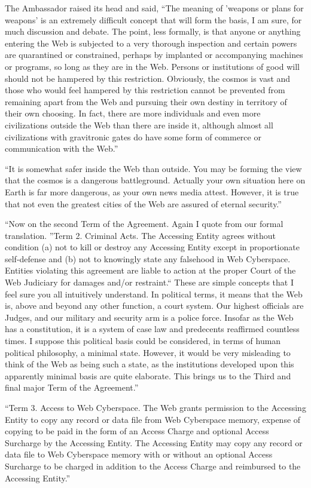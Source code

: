 \documentclass[english,11pt,letterpaper,onecolumn]{scrbook}
\begin{document}
	The Ambassador raised its head and said, ``The meaning of 'weapons or plans for weapons' is an extremely difficult concept that will form the basis, I am sure, for much discussion and debate.  The point, less formally, is that anyone or anything entering the Web is subjected to a very thorough inspection and certain powers are quarantined or constrained, perhaps by implanted or accompanying machines or programs, so long as they are in the Web.  Persons or institutions of good will should not be hampered by this restriction.  Obviously, the cosmos is vast and those who would feel hampered by this restriction cannot be prevented from remaining apart from the Web and pursuing their own destiny in territory of their own choosing.  In fact, there are more individuals and even more civilizations outside the Web than there are inside it, although almost all civilizations with gravitronic gates do have some form of commerce or communication with the Web.''
	
	``It is somewhat safer inside the Web than outside.  You may be forming the view that the cosmos is a dangerous battleground.  Actually your own situation here on Earth is far more dangerous, as your own news media attest.  However, it is true that not even the greatest cities of the Web are assured of eternal security.''
	
	``Now on the second Term of the Agreement.  Again I quote from our formal translation.  ''Term 2.  Criminal Acts.  The Accessing Entity agrees without condition (a) not to kill or destroy any Accessing Entity except in proportionate self-defense and (b) not to knowingly state any falsehood in Web Cyberspace.  Entities violating this agreement are liable to action at the proper Court of the Web Judiciary for damages and/or restraint.``  These are simple concepts that I feel sure you all intuitively understand.  In political terms, it means that the Web is, above and beyond any other function, a court system.  Our highest officials are Judges, and our military and security arm is a police force.  Insofar as the Web has a constitution, it is a system of case law and predecents reaffirmed countless times.  I suppose this political basis could be considered, in terms of human political philosophy, a minimal state.  However, it would be very misleading to think of the Web as being such a state, as the institutions developed upon this apparently minimal basis are quite elaborate.  This brings us to the Third and final major Term of the Agreement.''
	
	``Term 3.  Access to Web Cyberspace.  The Web grants permission to the Accessing Entity to copy any record or data file from Web Cyberspace memory, expense of copying to be paid in the form of an Access Charge and optional Access Surcharge by the Accessing Entity.  The Accessing Entity may copy any record or data file to Web Cyberspace memory with or without an optional Access Surcharge to be charged in addition to the Access Charge and reimbursed to the Accessing Entity.''
	
\end{document}
